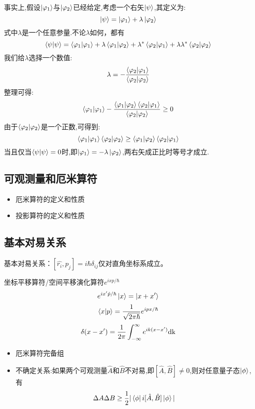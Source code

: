 \documentclass{article}
\begin{document}
\begin{enumerate}
    事实上,假设$\ket{\varphi_1}$与$\ket{\varphi_2}$已经给定,考虑一个右矢$\ket{\psi}$,其定义为:
    \begin{equation}
        \ket{\psi}=\ket{\varphi_1}+\lambda\ket{\varphi_2}
    \end{equation}
    式中$\lambda$是一个任意参量.不论$\lambda$如何，都有
    \begin{equation}
        \braket{\psi}{\psi}=\braket{\varphi_1}{\varphi_1}+\lambda\braket{\varphi_1}{\varphi_2}+\lambda^*\braket{\varphi_2}{\varphi_1}+\lambda\lambda^*\braket{\varphi_2}{\varphi_2}
    \end{equation}
    我们给$\lambda$选择一个数值:
    \begin{equation}
        \lambda=-\dfrac{\braket{\varphi_2}{\varphi_1}}{\braket{\varphi_2}{\varphi_2}}
    \end{equation}
    整理可得:
    \begin{equation}
        \braket{\varphi_1}{\varphi_1}-\dfrac{\braket{\varphi_1}{\varphi_2}\braket{\varphi_2}{\varphi_1}}{\braket{\varphi_2}{\varphi_2}}\geq0
    \end{equation}
    由于$\braket{\varphi_2}{\varphi_2}$是一个正数,可得到:
    \begin{equation}
         \braket{\varphi_1}{\varphi_1} \braket{\varphi_2}{\varphi_2}\geq \braket{\varphi_1}{\varphi_2} \braket{\varphi_2}{\varphi_1}
    \end{equation}
    当且仅当$\braket{\psi}{\psi}=0$时,即$\ket{\varphi_1}=-\lambda\ket{\varphi_2}$,两右矢成正比时等号才成立.
\end{enumerate}
\subsection{可观测量和厄米算符}
\begin{itemize}
    \item 厄米算符的定义和性质
    \item 投影算符的定义和性质
\end{itemize}
\subsection{基本对易关系}
基本对易关系：$[\hat{r_i},\hat{p_j}]=i\hbar\delta_{ij}$仅对直角坐标系成立。

坐标平移算符/空间平移演化算符$e^{ix\hat{p}/\hbar}$ $$e^{ix'\hat{p}/\hbar}\ket{x}=\ket{x+x'}$$
$$\braket{x}{p}=\frac{1}{\sqrt{2\pi\hbar}}e^{ipx/\hbar}$$
$$\delta(x-x')=\frac{1}{2\pi}\int_{-\infty}^{\infty}e^{ik(x-x')}\rm{d}k$$
\begin{itemize}
    \item 厄米算符完备组
    \item 不确定关系:如果两个可观测量$\hat{A}$和$\hat{B}$不对易,即$[\hat{A},\hat{B}]\neq0$,则对任意量子态$\ket{\phi}$,有
    $$\Delta A\Delta B\geq\frac{1}{2}|\bra{\phi}i[\hat{A},\hat{B}]\ket{\phi}|$$
\end{itemize}
\end{document}
